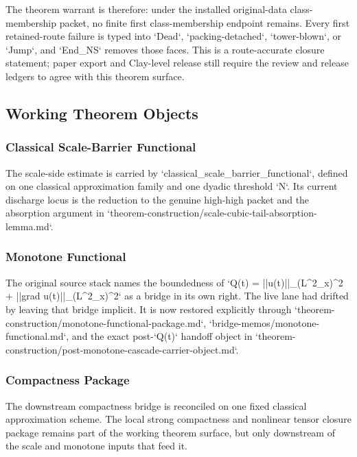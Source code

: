 The theorem warrant is therefore: under the installed original-data
class-membership packet, no finite first class-membership endpoint remains.
Every first retained-route failure is typed into `Dead`,
`packing-detached`, `tower-blown`, or `Jump`, and `End\_NS` removes those faces.
This is a route-accurate closure statement; paper export and Clay-level release
still require the review and release ledgers to agree with this theorem surface.

\subsection{Working Theorem Objects}

\subsubsection{Classical Scale-Barrier Functional}

The scale-side estimate is carried by `classical\_scale\_barrier\_functional`, defined on one classical approximation family and one dyadic threshold `N`. Its current discharge locus is the reduction to the genuine high-high packet and the absorption argument in `theorem-construction/scale-cubic-tail-absorption-lemma.md`.

\subsubsection{Monotone Functional}

The original source stack names the boundedness of `Q(t) = ||u(t)||\_(L\textasciicircum{}2\_x)\textasciicircum{}2 + ||grad u(t)||\_(L\textasciicircum{}2\_x)\textasciicircum{}2` as a bridge in its own right. The live lane had drifted by leaving that bridge implicit. It is now restored explicitly through `theorem-construction/monotone-functional-package.md`, `bridge-memos/monotone-functional.md`, and the exact post-`Q(t)` handoff object in `theorem-construction/post-monotone-cascade-carrier-object.md`.

\subsubsection{Compactness Package}

The downstream compactness bridge is reconciled on one fixed classical approximation scheme. The local strong compactness and nonlinear tensor closure package remains part of the working theorem surface, but only downstream of the scale and monotone inputs that feed it.

